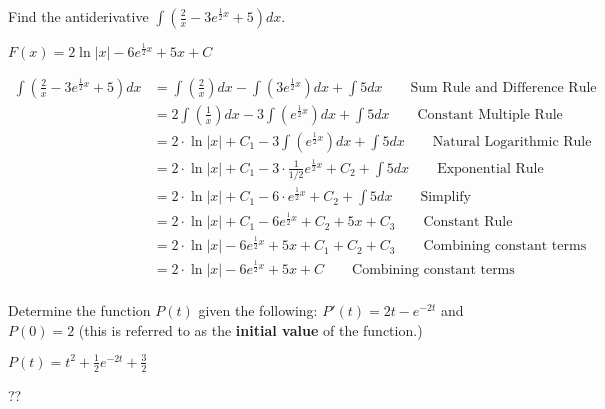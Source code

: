 \begin{example}
Find the antiderivative $\displaystyle\int \left(\frac{2}{x}-3e^{\frac{1}{2}x}+5\right) dx$. 
    \begin{sol}
     $F(x)=2\ln|x|-6e^{\frac{1}{2}x}+5x+C$ 
    \end{sol}
    \begin{solL}
    \begin{displaymath}
         \begin{split}
             \int \left(\frac{2}{x}-3e^{\frac{1}{2}x}+5\right) dx &= \int \left(\frac{2}{x}\right) dx -\int \left(3e^{\frac{1}{2}x}\right) dx+\int 5 dx \qquad \text{Sum Rule and Difference Rule}\\
             &= 2\int \left(\frac{1}{x}\right) dx -3\int \left(e^{\frac{1}{2}x}\right) dx+\int 5 dx \qquad \text{Constant Multiple Rule}\\
             &= 2\cdot \ln|x|+C_1 -3\int \left(e^{\frac{1}{2}x}\right) dx+\int 5 dx \qquad \text{Natural Logarithmic Rule}\\
             &= 2\cdot \ln|x|+C_1 -3\cdot \frac{1}{1/2}e^{\frac{1}{2}x}+C_2+\int 5 dx \qquad \text{Exponential Rule}\\
              &= 2\cdot \ln|x|+C_1 -6\cdot e^{\frac{1}{2}x}+C_2+\int 5 dx \qquad \text{Simplify}\\
             &= 2\cdot \ln|x|+C_1 -6e^{\frac{1}{2}x}+C_2+5x+C_3 \qquad \text{Constant Rule}\\
             &= 2\cdot \ln|x|-6e^{\frac{1}{2}x}+5x+C_1+C_2+C_3 \qquad \text{Combining constant terms}\\
             &= 2\cdot \ln|x|-6e^{\frac{1}{2}x}+5x+C \qquad \text{Combining constant terms}\\
         \end{split}
    \end{displaymath}
    
    \end{solL}
    
\end{example}
\begin{example}
Determine the function $P(t)$ given the following: $P'(t)=2t-e^{-2t}$ and $P(0)=2$ (this is referred to as the \textbf{initial value} of the function.)
    \begin{sol}
     $P(t)=t^2+\displaystyle\frac{1}{2}e^{-2t}+\displaystyle\frac{3}{2}$ 
    \end{sol}
    \begin{solL}
    ??
    
    \end{solL}
    
\end{example}

